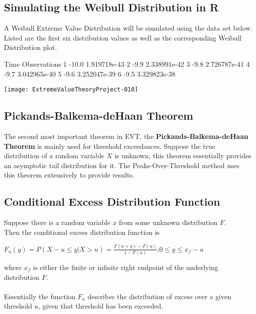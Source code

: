 \documentclass[11pt,a4paper]{article}
\theoremstyle{plain}
\begin{document}
\newpage
\subsection*{Simulating the Weibull Distribution in R} 
A Weibull Extreme Value Distribution will be simulated using the data set below. Listed are the first six distribution values as well as the corresponding Weibull Distribution plot.
\begin{Schunk}
\begin{Soutput}
   Time Observations
1 -10.0 1.919718e-43
2  -9.9 2.338991e-42
3  -9.8 2.726787e-41
4  -9.7 3.042965e-40
5  -9.6 3.252047e-39
6  -9.5 3.329823e-38
\end{Soutput}
\end{Schunk}

\texttt{[image: ExtremeValueTheoryProject-010]}


\newpage
\subsection{Pickands-Balkema-deHaan Theorem}
The second most important theorem in EVT, the \textbf{Pickands-Balkema-deHaan Theorem} is mainly used for threshold exceedances. Suppose the true distribution of a random variable $X$ is unknown, this theorem essentially provides an asymptotic tail distribution for it. The Peaks-Over-Threshold method uses this theorem extensively to provide results.

\subsection*{Conditional Excess Distribution Function}
Suppose there is a random variable $x$ from some unknown distribution $F$.\\
Then the conditional excess distribution function is
\begin{center}
$F_u(y)=P(X-u \leq y |X>u)=\frac{F(u+y)-F(u)}{1-F(u)}$,\;\;\;\;\;$0\leq y \leq x_f-u$
\end{center}
where $x_f$ is either the finite or infinite right endpoint of the underlying distribution $F$.\\
\\
Essentially the function $F_u$ describes the distribution of excess over a given threshold $u$, given that threshold has been exceeded.
\end{document}
